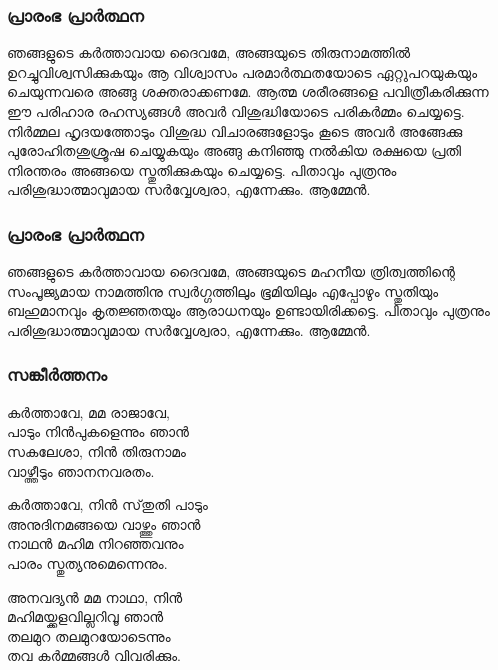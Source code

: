 \documentclass[20pt]{beamer}
\newcommand{\Priest}[1]{\color{white}#1}
\newcommand{\People}[1]{\color{yellow}#1}
\newcommand{\SignOfCross}{പിതാവും പുത്രനും പരിശുദ്ധാത്മാവുമായ സര്‍വ്വേശ്വരാ, എന്നേക്കും.}
\newcommand{\Ammen}{\People{ആമ്മേന്‍.}}
\begin{document}
\begin{frame}[allowframebreaks]
\frametitle{പ്രാരംഭ പ്രാര്‍ത്ഥന}
\Priest{
ഞങ്ങളുടെ കര്‍ത്താവായ ദൈവമേ, അങ്ങയുടെ തിരുനാമത്തില്‍ 
ഉറച്ചുവിശ്വസിക്കുകയും ആ വിശ്വാസം പരമാര്‍ത്ഥതയോടെ 
ഏറ്റുപറയുകയും ചെയുന്നവരെ അങ്ങു ശക്തരാക്കണമേ.
ആത്മ ശരീരങ്ങളെ പവിത്രീകരിക്കുന്ന ഈ പരിഹാര രഹസ്യങ്ങള്‍ 
അവര്‍ വിശുദ്ധിയോടെ പരികര്‍മ്മം ചെയ്യട്ടെ. നിര്‍മ്മല
ഹൃദയത്തോടും വിശുദ്ധ വിചാരങ്ങളോടും കൂടെ അവര്‍
അങ്ങേക്കു പുരോഹിതശുശ്രൂഷ ചെയ്യുകയും അങ്ങു കനിഞ്ഞു 
നല്‍കിയ രക്ഷയെ പ്രതി നിരന്തരം അങ്ങയെ സ്തുതിക്കുകയും ചെയ്യട്ടെ.
\SignOfCross} \Ammen
\end{frame}

\begin{frame}[allowframebreaks]
\frametitle{പ്രാരംഭ പ്രാര്‍ത്ഥന}
\Priest{
ഞങ്ങളുടെ കര്‍ത്താവായ ദൈവമേ, അങ്ങയുടെ മഹനീയ
ത്രിത്വത്തിന്റെ സംപൂജ്യമായ നാമത്തിനു സ്വര്‍ഗ്ഗത്തിലും ഭൂമിയിലും
എപ്പോഴും സ്തുതിയും ബഹുമാനവും കൃതജ്ഞതയും ആരാധനയും
ഉണ്ടായിരിക്കട്ടെ. \SignOfCross} \Ammen
\end{frame}


\begin{frame}[allowframebreaks]
\frametitle{സങ്കീര്‍ത്തനം}
\Priest{
കര്‍ത്താവേ, മമ രാജാവേ,\\
പാടും നിൻപുകളെന്നും ഞാൻ\\
സകലേശാ, നിൻ തിരുനാമം\\
വാഴ്ത്തീടും ഞാനനവരതം.}\par
\framebreak
\People{
കര്‍ത്താവേ, നിൻ സ്‌തുതി പാടും\\
അനുദിനമങ്ങയെ വാഴ്ത്തും ഞാൻ\\
നാഥൻ മഹിമ നിറഞ്ഞവനും\\
പാരം സ്തുത്യനുമെന്നെനും.\par
അനവദ്യൻ മമ നാഥാ, നിൻ\\
മഹിമയ്ക്കളവില്ലറിവൂ ഞാൻ\\
തലമുറ തലമുറയോടെന്നും\\
തവ കർമ്മങ്ങൾ വിവരിക്കും.}
\end{frame}


\iffalse
\begin{frame}[allowframebreaks]
\frametitle{ധൂപാശീര്‍വ്വാദം}
\Priest{
പിതാവും പുത്രനും പരിശുദ്ധാത്മാവുമായ സര്‍വേശ്വര,
അങ്ങയുടെ ബഹുമാനത്തി നായി ഞങള്‍ സമര്‍പ്പിക്കുന്ന ഈ ധുപം
അങ്ങയുടെ മഹനീയ ത്രിത്വത്തിന്‍റെ നാമത്തില്‍ + ആശീര്‍വ്വദിക്കപ്പെടട്ടെ.
ഇത് അങ്ങയുടെ പ്രസാദത്തിനും അങ്ങയുടെ അജഗണത്തിന്റെ
പാപങ്ങളുടെ മോചനത്തിനും കാരണമാകട്ടെ. എന്നേക്കും.} \Ammen
\end{frame}
\fi
\end{document}
